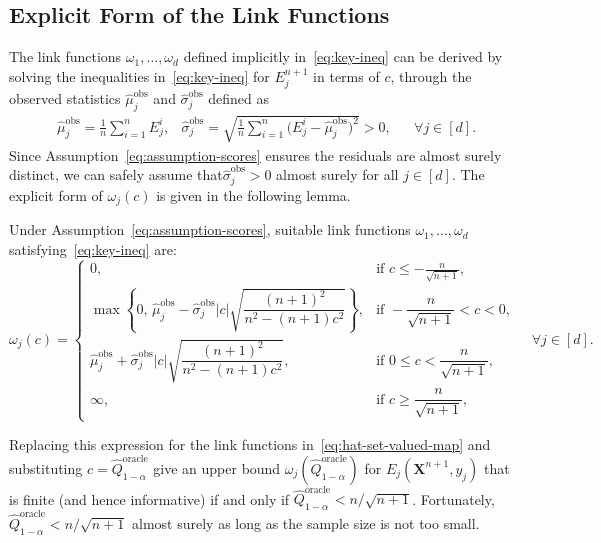 {\color{blue}
\subsection{Explicit Form of the Link Functions}
The link functions $\omega_1, \ldots, \omega_d$ defined implicitly in~\eqref{eq:key-ineq} can be derived by solving the inequalities in~\eqref{eq:key-ineq} for ${E}^{n+1}_j$ in terms of $c$, through the observed statistics $\hat{\mu}^\mathrm{obs}_j$ and $\hat{\sigma}^\mathrm{obs}_j$ defined as
\begin{equation} \label{eq:plug-in-mean-std}
\begin{aligned}
& \hat{\mu}^\mathrm{obs}_j = \frac{1}{n} \sum_{i=1}^{n} {E}^i_j,
& \hat{\sigma}^\mathrm{obs}_j =  \sqrt{\frac{1}{n} \sum_{i=1}^{n} \!\bigl({E}^i_j - \hat{\mu}^\mathrm{obs}_j\bigr)^2} > 0,
&& \forall j \in [d].
\end{aligned}
\end{equation}
Since Assumption~\ref{eq:assumption-scores} ensures the residuals are almost surely distinct, we can safely assume that$\hat{\sigma}^\mathrm{obs}_j > 0$ almost surely for all $j \in [d]$.
The explicit form of $\omega_j(c)$ is given in the following lemma.}

\begin{lemma}\label{lem:solution-key-ineq}
Under Assumption~\ref{eq:assumption-scores}, suitable link functions $\omega_1, \ldots ,\omega_d$ satisfying~\eqref{eq:key-ineq} are:
\[
    \omega_j(c)
    =
    \begin{cases}
    0, & \text{if } c \leq -\frac{n}{\sqrt{n+1}},\\
    \max\!\left\{0,\,
    \hat{\mu}^\mathrm{obs}_j - \hat{\sigma}^\mathrm{obs}_j |c|
    \sqrt{\dfrac{(n+1)^2}{n^2 - (n+1)c^2}}\right\},
    & \text{if } -\dfrac{n}{\sqrt{n+1}} < c < 0, \\[1.1em]
    \hat{\mu}^\mathrm{obs}_j + \hat{\sigma}^\mathrm{obs}_j |c|
    \sqrt{\dfrac{(n+1)^2}{n^2 - (n+1)c^2}},
    & \text{if } 0 \le c < \dfrac{n}{\sqrt{n+1}}, \\[1.1em]
    \infty, & \text{if } c \ge \dfrac{n}{\sqrt{n+1}},
    \end{cases}\quad\forall j \in [d].
\]
\end{lemma}

Replacing this expression for the link functions in~\eqref{eq:hat-set-valued-map} and substituting $c = \hat{Q}^{\mathrm{oracle}}_{1-\alpha}$ give an upper bound $\omega_j(\hat{Q}^{\mathrm{oracle}}_{1-\alpha})$ for $E_j(\mathbf{X}^{n+1}, y_j)$ that is finite (and hence informative) if and only if $\hat{Q}^{\mathrm{oracle}}_{1-\alpha} <n/\sqrt{n+1}$. Fortunately, $\hat{Q}^{\mathrm{oracle}}_{1-\alpha} <n/\sqrt{n+1}$ almost surely as long as the sample size is not too small.

